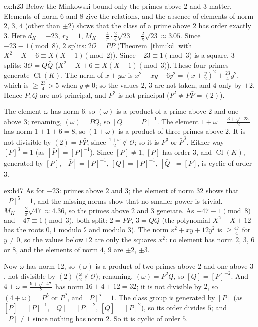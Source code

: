 \begin{solution}{ex:h23}
\idea Below the Minkowski bound only the primes above $2$ and $3$ matter. Elements of norm $6$ and $8$ give the relations,
and the absence of elements of norm $2$, $3$, $4$ (other than $\pm2$) shows that the class of a prime above $2$ has order
exactly $3$.
\writeup Here $d_K=-23$, $r_2=1$, $M_K=\frac4\pi\cdot\frac24\sqrt{23}=\frac2\pi\sqrt{23}\approx3.05$. Since $-23\equiv1
\pmod 8$, $2$ splits: $2\mathcal O=P\bar P$ (Theorem~\ref{thm:kd} with $X^2-X+6\equiv X(X-1)\pmod2$). Since $-23\equiv1\pmod3$
is a square, $3$ splits: $3\mathcal O=Q\bar Q$ ($X^2-X+6\equiv X(X-1)\pmod 3$). These four primes generate
$\operatorname{Cl}(K)$. The norm of $x+y\omega$ is $x^2+xy+6y^2=(x+\frac y2)^2+\frac{23}4y^2$, which is $\ge\frac{23}4>5$
when $y\ne0$; so the values $2$, $3$ are not taken, and $4$ only by $\pm2$. Hence $P,Q$ are not principal, and $P^2$ is not
principal ($P^2\ne P\bar P=(2)$).

The element $\omega$ has norm $6$, so $(\omega)$ is a product of a prime above $2$ and one above $3$; renaming, $(\omega)=PQ$,
so $[Q]=[P]^{-1}$. The element $1+\omega=\frac{3+\sqrt{-23}}2$ has norm $1+1+6=8$, so $(1+\omega)$ is a product of three
primes above $2$. It is not divisible by $(2)=P\bar P$, since $\frac{1+\omega}2\notin\mathcal O$; so it is $P^3$ or $\bar
P^3$. Either way $[P]^3=1$ (as $[\bar P]=[P]^{-1}$). Since $[P]\ne1$, $[P]$ has order $3$, and $\operatorname{Cl}(K)$,
generated by $[P]$, $[\bar P]=[P]^{-1}$, $[Q]=[P]^{-1}$, $[\bar Q]=[P]$, is cyclic of order $3$.
\end{solution}

\begin{solution}{ex:h47}
\idea As for $-23$: primes above $2$ and $3$; the element of norm $32$ shows that $[P]^5=1$, and the missing norms show
that no smaller power is trivial.
\writeup $M_K=\frac2\pi\sqrt{47}\approx4.36$, so the primes above $2$ and $3$ generate. As $-47\equiv1\pmod8$ and $-47\equiv1
\pmod 3$, both split: $2=P\bar P$, $3=Q\bar Q$ (the polynomial $X^2-X+12$ has the roots $0,1$ modulo $2$ and modulo $3$).
The norm $x^2+xy+12y^2$ is $\ge\frac{47}4$ for $y\ne0$, so the values below $12$ are only the squares $x^2$: no element has
norm $2$, $3$, $6$ or $8$, and the elements of norm $4$, $9$ are $\pm2$, $\pm3$.

Now $\omega$ has norm $12$, so $(\omega)$ is a product of two primes above $2$ and one above $3$, not divisible by $(2)$
($\frac\omega2\notin\mathcal O$); renaming, $(\omega)=P^2Q$, so $[Q]=[P]^{-2}$. And $4+\omega=\frac{9+\sqrt{-47}}2$ has
norm $16+4+12=32$; it is not divisible by $2$, so $(4+\omega)=P^5$ or $\bar P^5$, and $[P]^5=1$. The class group is
generated by $[P]$ (as $[\bar P]=[P]^{-1}$, $[Q]=[P]^{-2}$, $[\bar Q]=[P]^2$), so its order divides $5$; and $[P]\ne1$
since nothing has norm $2$. So it is cyclic of order $5$.
\end{solution}

